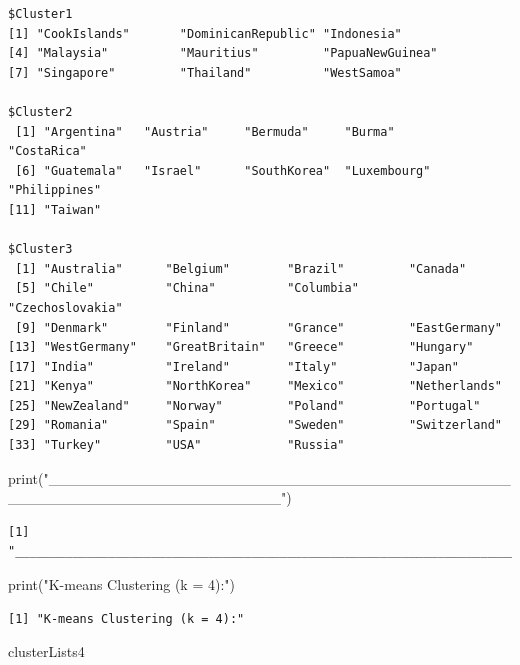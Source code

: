 \documentclass[
  letterpaper,
  DIV=11,
  numbers=noendperiod]{scrartcl}
\newenvironment{Shaded}{}{}
\newcommand{\FunctionTok}[1]{\textcolor[rgb]{0.41,0.62,0.42}{#1}}
\newcommand{\NormalTok}[1]{\textcolor[rgb]{0.24,0.22,0.21}{#1}}
\newcommand{\StringTok}[1]{\textcolor[rgb]{0.60,0.59,0.10}{#1}}
\begin{document}
\begin{verbatim}
$Cluster1
[1] "CookIslands"       "DominicanRepublic" "Indonesia"        
[4] "Malaysia"          "Mauritius"         "PapuaNewGuinea"   
[7] "Singapore"         "Thailand"          "WestSamoa"        

$Cluster2
 [1] "Argentina"   "Austria"     "Bermuda"     "Burma"       "CostaRica"  
 [6] "Guatemala"   "Israel"      "SouthKorea"  "Luxembourg"  "Philippines"
[11] "Taiwan"     

$Cluster3
 [1] "Australia"      "Belgium"        "Brazil"         "Canada"        
 [5] "Chile"          "China"          "Columbia"       "Czechoslovakia"
 [9] "Denmark"        "Finland"        "Grance"         "EastGermany"   
[13] "WestGermany"    "GreatBritain"   "Greece"         "Hungary"       
[17] "India"          "Ireland"        "Italy"          "Japan"         
[21] "Kenya"          "NorthKorea"     "Mexico"         "Netherlands"   
[25] "NewZealand"     "Norway"         "Poland"         "Portugal"      
[29] "Romania"        "Spain"          "Sweden"         "Switzerland"   
[33] "Turkey"         "USA"            "Russia"        
\end{verbatim}

\begin{Shaded}
\begin{Highlighting}[]
\FunctionTok{print}\NormalTok{(}\StringTok{"\_\_\_\_\_\_\_\_\_\_\_\_\_\_\_\_\_\_\_\_\_\_\_\_\_\_\_\_\_\_\_\_\_\_\_\_\_\_\_\_\_\_\_\_\_\_\_\_\_\_\_\_\_\_\_\_\_\_\_\_\_\_\_\_\_\_\_\_\_\_"}\NormalTok{)}
\end{Highlighting}
\end{Shaded}

\begin{verbatim}
[1] "______________________________________________________________________"
\end{verbatim}

\begin{Shaded}
\begin{Highlighting}[]
\FunctionTok{print}\NormalTok{(}\StringTok{"K{-}means Clustering (k = 4):"}\NormalTok{)}
\end{Highlighting}
\end{Shaded}

\begin{verbatim}
[1] "K-means Clustering (k = 4):"
\end{verbatim}

\begin{Shaded}
\begin{Highlighting}[]
\NormalTok{clusterLists4}
\end{Highlighting}
\end{Shaded}
\end{document}
